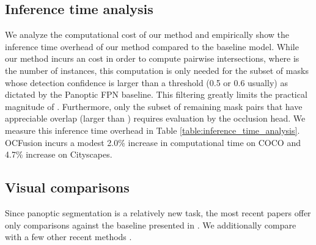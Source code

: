 \documentclass[10pt,twocolumn,letterpaper]{article}
\begin{document}
\subsection{Inference time analysis}
We analyze the computational cost of our method and empirically show the inference time overhead of our method compared to the baseline model. While our method incurs an  cost in order to compute pairwise intersections, where  is the number of instances, this computation is only needed for the subset of masks whose detection confidence is larger than a threshold (0.5 or 0.6 usually) as dictated by the Panoptic FPN \cite{kirillov2019panoptic} baseline. This filtering greatly limits the practical magnitude of . Furthermore, only the subset of remaining mask pairs that have appreciable overlap (larger than ) requires evaluation by the occlusion head. We measure this inference time overhead in Table \ref{table:inference_time_analysis}. OCFusion incurs a modest 2.0\% increase in computational time on COCO and 4.7\% increase on Cityscapes.

\vspace{-1.5mm}
\begin{table}[!htp]
\vspace{-0mm}
\centering
{}
\vspace{-2mm}
\caption{ \textbf{Runtime (ms) overhead per image.} Runtime results are averaged over the entire COCO and Cityscapes validation dataset. We use a single GeForce GTX 1080 Ti GPU and Xeon(R) CPU E5-2687W CPU.
} 
\label{table:inference_time_analysis}
\vspace{-5mm}
\end{table}



\subsection{Visual comparisons}

Since panoptic segmentation is a relatively new task, the most recent papers offer only comparisons against the baseline presented in \cite{kirillov2018panoptic}. We additionally compare with a few other recent methods \cite{liu2019end,xiong2019upsnet}.
\end{document}
